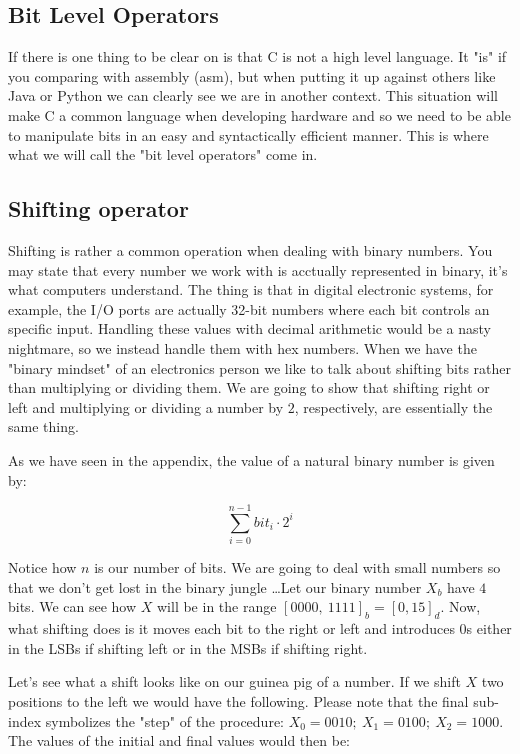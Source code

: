 \documentclass[12pt]{book}
\begin{document}
            \subsection{Bit Level Operators}
              If there is one thing to be clear on is that C is not a high level language. It "is" if you comparing with assembly (asm), but when putting it up against others like Java or Python we can clearly see we are in another context. This situation will make C a common language when developing hardware and so we need to be able to manipulate bits in an easy and syntactically efficient manner. This is where what we will call the "bit level operators" come in.

              \subsection{Shifting operator}
                Shifting is rather a common operation when dealing with binary numbers. You may state that every number we work with is acctually represented in binary, it's what computers understand. The thing is that in digital electronic systems, for example, the I/O ports are actually 32-bit numbers where each bit controls an specific input. Handling these values with decimal arithmetic would be a nasty nightmare, so we instead handle them with hex numbers. When we have the "binary mindset" of an electronics person we like to talk about shifting bits rather than multiplying or dividing them. We are going to show that shifting right or left and multiplying or dividing a number by $2$, respectively, are essentially the same thing.

                As we have seen in the appendix, the value of a natural binary number is given by:

                $$\sum_{i = 0}^{n - 1} bit_i \cdot 2^{i}$$

                Notice how $n$ is our number of bits. We are going to deal with small numbers so that we don't get lost in the binary jungle \dots Let our binary number $X_b$ have $4$ bits. We can see how $X$ will be in the range $[0000,\ 1111]_b = [0, 15]_d$. Now, what shifting does is it moves each bit to the right or left and introduces $0$s either in the LSBs if shifting left or in the MSBs if shifting right.

                Let's see what a shift looks like on our guinea pig of a number. If we shift $X$ two positions to the left we would have the following. Please note that the final sub-index symbolizes the "step" of the procedure: $X_0 = 0010;\ X_1 = 0100;\ X_2 = 1000$. The values of the initial and final values would then be:
\end{document}
